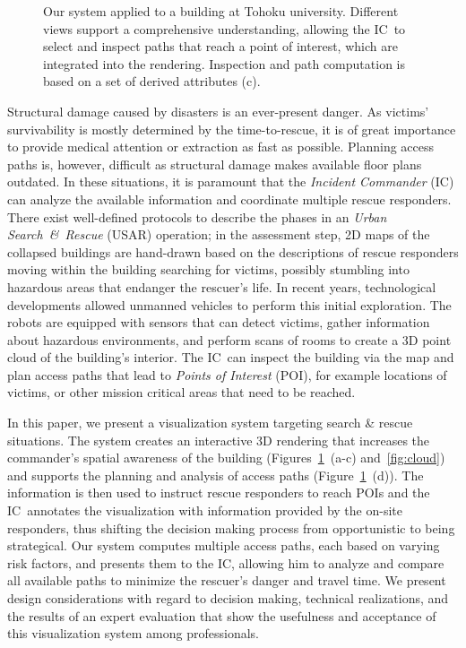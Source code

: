 \documentclass[conference,10pt,letter]{IEEEtran}
\def\IC{IC}
\begin{document}
\begin{figure}
  \caption{Our system applied to a building at Tohoku university. Different views support a comprehensive understanding, allowing the \IC\ to select and inspect paths that reach a point of interest, which are integrated into the rendering. Inspection and path computation is based on a set of derived attributes (c).}
  \label{fig:teaser}
\end{figure}

Structural damage caused by disasters is an ever-present danger. As victims' survivability is mostly determined by the time-to-rescue, it is of great importance to provide medical attention or extraction as fast as possible. Planning access paths is, however, difficult as structural damage makes available floor plans outdated. In these situations, it is paramount that the \emph{Incident Commander} (IC) can analyze the available information and coordinate multiple rescue responders. There exist well-defined protocols to describe the phases in an \emph{Urban Search~\&~Rescue} (USAR) operation; in the assessment step, 2D maps of the collapsed buildings are hand-drawn based on the descriptions of rescue responders moving within the building searching for victims, possibly stumbling into hazardous areas that endanger the rescuer's life. In recent years, technological developments allowed unmanned vehicles to perform this initial exploration. The robots are equipped with sensors that can detect victims, gather information about hazardous environments, and perform scans of rooms to create a 3D point cloud of the building's interior. The \IC\ can inspect the building via the map and plan access paths that lead to \emph{Points of Interest} (POI), for example locations of victims, or other mission critical areas that need to be reached.

In this paper, we present a visualization system targeting search \& rescue situations. The system creates an interactive 3D rendering that increases the commander's spatial awareness of the building (Figures~\ref{fig:teaser}~(a-c) and~\ref{fig:cloud}) and supports the planning and analysis of access paths (Figure~\ref{fig:teaser}~(d)). The information is then used to instruct rescue responders to reach POIs and the \IC\ annotates the visualization with information provided by the on-site responders, thus shifting the decision making process from opportunistic to being strategical. Our system computes multiple access paths, each based on varying risk factors, and presents them to the \IC , allowing him to analyze and compare all available paths to minimize the rescuer's danger and travel time. We present design considerations with regard to decision making, technical realizations, and the results of an expert evaluation that show the usefulness and acceptance of this visualization system among professionals.
\end{document}
